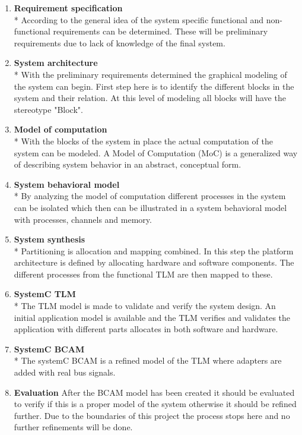 \begin{enumerate}
		
  \item \textbf{Requirement specification}\\*
  		According to the general idea of the system specific functional and non-functional requirements can be determined. These will be preliminary requirements due to lack of knowledge of the final system. 
  \item \textbf{System architecture}\\*
  		With the preliminary requirements determined the graphical modeling of the system can begin. First step here is to identify the different blocks in the system and their relation. At this level of modeling all blocks will have the stereotype "Block".
  \item \textbf{Model of computation}\\*
  		With the blocks of the system in place the actual computation of the system can be modeled. A Model of Computation (MoC) is a generalized way of describing system behavior in an abstract, conceptual form. 
  \item \textbf{System behavioral model}\\*
  		By analyzing the model of computation different processes in the system can be isolated which then can be illustrated in a system behavioral model with processes, channels and memory.
  \item \textbf{System synthesis}\\*
  		Partitioning is allocation and mapping combined. In this step the platform architecture is defined by allocating hardware and software components. The different processes from the functional TLM are then mapped to these. 
  \item \textbf{SystemC TLM}\\*
  The TLM model is made to validate and verify the system design. An initial application model is available and the TLM verifies and validates the application with different parts allocates in both software and hardware.
  		
  \item \textbf{SystemC BCAM}\\*
  		The systemC BCAM is a refined model of the TLM where adapters are added with real bus signals. 
  \item \textbf{Evaluation}
  		After the BCAM model has been created it should be evaluated to verify if this is a proper model of the system otherwise it should be refined further. Due to the boundaries of this project the process stops here and no further refinements will be done.
\end{enumerate}
